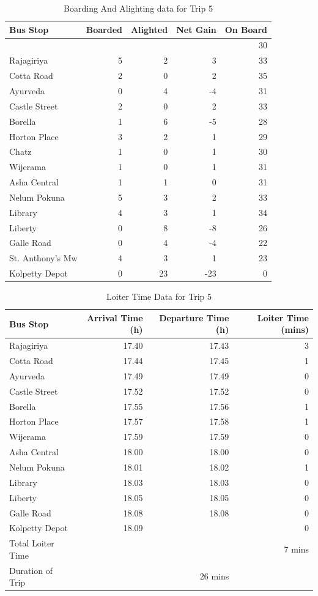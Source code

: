 \documentclass[12pt, oneside]{report}
\begin{document}
\begin{table}
\centering
\begin{tabular}{|l|r|r|r|r|}
\hline
Bus Stop & Boarded & Alighted & Net Gain & On Board \\
\hline
 & & & & 30 \\
Rajagiriya	&5	&2	&3	&33\\
Cotta Road	&2	&0	&2	&35\\
Ayurveda	&0	&4	&-4	&31\\
Castle Street	&2	&0	&2	&33\\
Borella	&1	&6	&-5	&28\\
Horton Place	&3	&2	&1	&29\\
\rowcolor[gray]{0.7}
Chatz	&1	&0	&1	&30\\
Wijerama	&1	&0	&1	&31\\
Asha Central	&1	&1	&0	&31\\
Nelum Pokuna	&5	&3	&2	&33\\
Library	&4	&3	&1	&34\\
Liberty	&0	&8	&-8	&26\\
Galle Road	&0	&4	&-4	&22\\
\rowcolor[gray]{0.7}
St. Anthony's Mw	&4	&3	&1	&23\\
Kolpetty Depot	&0	&23	&-23	&0\\
\hline
\end{tabular}
\caption{Boarding And Alighting data for Trip 5}
\label{table-trip5-BoardingAndAlighting}
\end{table}

\begin{table}
\centering
\begin{tabular}{|l|r|r|r|}
\hline
Bus Stop & Arrival Time (h) & Departure Time (h) & Loiter Time (mins) \\
\hline
Rajagiriya	&17.40	&17.43	&3\\
Cotta Road	&17.44	&17.45	&1\\
Ayurveda	&17.49	&17.49	&0\\
Castle Street	&17.52	&17.52	&0\\
Borella	&17.55	&17.56	&1\\
Horton Place	&17.57	&17.58	&1\\
Wijerama	&17.59	&17.59	&0\\
Asha Central	&18.00	&18.00	&0\\
Nelum Pokuna	&18.01	&18.02	&1\\
Library	&18.03	&18.03	&0\\
Liberty	&18.05	&18.05	&0\\
Galle Road	&18.08	&18.08	&0\\
Kolpetty Depot	&18.09	&	&0\\
\hline
Total Loiter Time & & & 7 mins \\
Duration of Trip & & 26 mins & \\
\hline
\end{tabular}
\caption{Loiter Time Data for Trip 5}
\label{table-trip5-LoiterTime}
\end{table}



\end{document}
